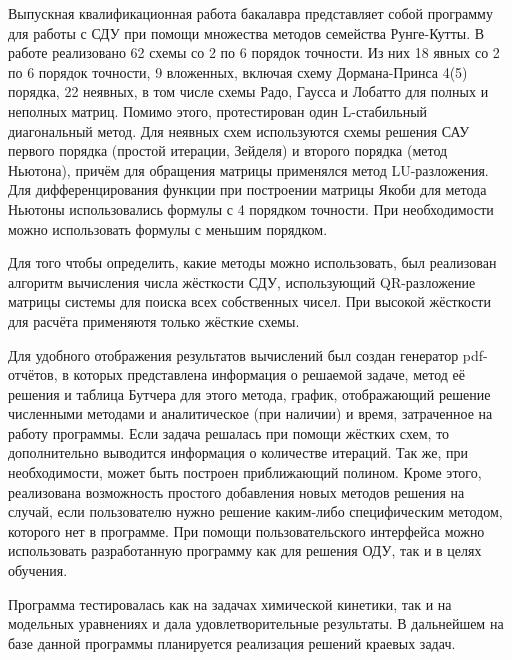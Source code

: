 \conclusion

Выпускная квалификационная работа бакалавра представляет собой программу для работы с СДУ при помощи множества методов семейства Рунге-Кутты. В работе
реализовано 62 схемы со 2 по 6 порядок точности. Из них 18 явных со 2 по 6 порядок точности, 9 вложенных, включая схему Дормана-Принса 4(5) порядка,
22 неявных, в том числе
схемы Радо, Гаусса и Лобатто для полных и неполных матриц. Помимо этого, протестирован один L-стабильный диагональный метод. Для
неявных схем используются схемы решения САУ первого порядка (простой итерации, Зейделя) и второго порядка (метод Ньютона), причём
для обращения
матрицы применялся метод LU-разложения. Для дифференцирования функции при построении матрицы Якоби для метода Ньютоны использовались
формулы с 4 порядком точности. При необходимости можно использовать формулы с меньшим порядком.

Для того чтобы определить, какие методы можно использовать, был реализован алгоритм вычисления числа жёсткости СДУ, использующий
QR-разложение матрицы системы для поиска всех собственных чисел. При высокой жёсткости для расчёта применяютя только жёсткие
схемы.

Для удобного отображения результатов вычислений был создан генератор pdf-отчётов, в которых представлена информация о решаемой задаче,
метод её решения и таблица Бутчера для этого метода, график, отображающий решение численными методами и аналитическое (при наличии) и
время, затраченное на работу программы. Если задача решалась при помощи жёстких схем, то дополнительно выводится информация о
количестве итераций. Так же, при необходимости, может быть построен приближающий полином. Кроме этого, реализована возможность простого
добавления новых методов решения на случай, если пользователю нужно решение каким-либо специфическим методом, которого нет в программе.
При помощи пользовательского интерфейса можно использовать разработанную программу как для решения ОДУ, так и в целях обучения.

Программа тестировалась как на задачах химической кинетики, так и на модельных уравнениях и дала удовлетворительные результаты.
В дальнейшем на базе данной программы планируется реализация решений краевых задач.

